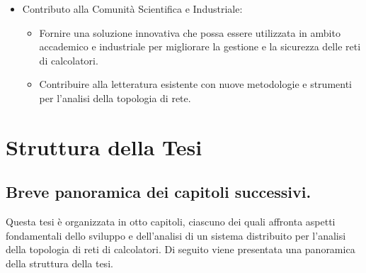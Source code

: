\documentclass[target=bach,aauheader=,style=]{thud}
\begin{document}
\begin{itemize}
  \item Contributo alla Comunità Scientifica e Industriale:
    \begin{itemize}
      \item Fornire una soluzione innovativa che possa essere utilizzata in ambito accademico e industriale per migliorare la gestione e la sicurezza delle reti di calcolatori.
      \item Contribuire alla letteratura esistente con nuove metodologie e strumenti per l'analisi della topologia di rete.
    \end{itemize}

\end{itemize}



\section{Struttura della Tesi}
\subsection{Breve panoramica dei capitoli successivi.}
Questa tesi è organizzata in otto capitoli, ciascuno dei quali affronta aspetti fondamentali dello sviluppo e dell'analisi di un sistema distribuito per l'analisi della topologia di reti di calcolatori. Di seguito viene presentata una panoramica della struttura della tesi.
\end{document}
